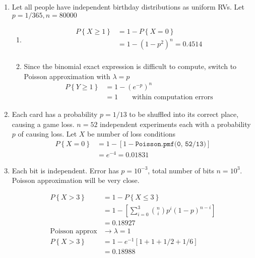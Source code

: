 \begin{enumerate}
\begin{enumerate}
		\end{enumerate}
	 
	
	\item Let all people have independent birthday distributions as uniform RVs. Let $ p = 1/365 , n = 80000$
	
		\begin{enumerate}
			\item 
			\begin{align}
				P \left\{X \geq 1\right\} &= 1 - P\left\{X = 0\right\} \nonumber \\
				&= 1 - (1-p^2)^n = 0.4514 \\
			\end{align}
			
			\item Since the binomial exact expression is difficult to compute, switch to Poisson approximation with $ \lambda = p $\\
			\begin{align}
				P \left\{Y \geq 1\right\} &= 1 - (e^{-p})^n \nonumber \\
				&= 1 \qquad \text{within computation errors}
			\end{align}
			
		\end{enumerate}
	 
	
	\item Each card has a probability $ p = 1/13 $ to be shuffled into its correct place, causing a game loss. $ n = 52 $ independent experiments each with a probability $ p $ of causing loss. Let $ X $ be number of loss conditions \\
	
		\begin{align}
			P \left\{X = 0 \right\} &= 1 - [1 - \texttt{Poisson.pmf(0, 52/13)}] \nonumber \\
			&= e^{-4} = 0.01831
		\end{align}
	 
	
	\item Each bit is independent. Error has $ p = 10^{-3} $, total number of bits $ n = 10^3 $. Poisson approximation will be very close.
	
		\begin{align}
			P \left\{X > 3 \right\} &= 1 - P \left\{X \leq 3 \right\} \nonumber \\
			&= 1 - \left[\sum\limits_{i = 0}^{3} \binom{n}{i} p^i (1-p)^{n-i}\right] \nonumber \\
			&= 0.18927 \\
			\text{Poisson approx} &\to \lambda = 1 \\
			P \left\{X > 3 \right\} &= 	1 - e^{-1}\left[1 + 1 + 1/2 + 1/6 \right] \nonumber \\
			&= 0.18988
		\end{align}
	 

\end{enumerate}
